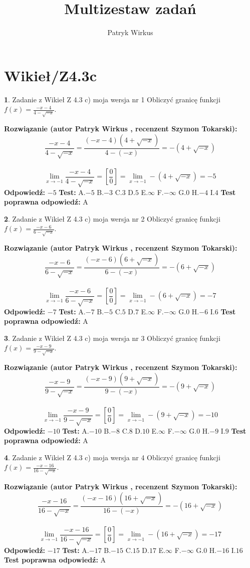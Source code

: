 \documentclass[12pt, a4paper]{article}
\title{Multizestaw zadań}
\author{Patryk Wirkus}
\date{}
\theoremstyle{definition} %
\newtheorem{zad}{}
\newcommand{\kategoria}[1]{\section{#1}}
\newcommand{\zadStart}[1]{\begin{zad}#1\newline}
\newcommand{\zadStop}{\end{zad}}
\newcommand{\rozwStart}[2]{\noindent \textbf{Rozwiązanie (autor #1 , recenzent #2): }\newline}
\newcommand{\rozwStop}{\newline}
\newcommand{\odpStart}{\noindent \textbf{Odpowiedź:}\newline}
\newcommand{\odpStop}{\newline}
\newcommand{\testStart}{\noindent \textbf{Test:}\newline}
\newcommand{\testStop}{\newline}
\newcommand{\kluczStart}{\noindent \textbf{Test poprawna odpowiedź:}\newline}
\newcommand{\kluczStop}{\newline}
\begin{document}
\maketitle

\kategoria{Wikieł/Z4.3c}


\zadStart{Zadanie z Wikieł Z 4.3 c) moja wersja nr 1}
Obliczyć granicę funkcji $f(x)=\frac{-x-4}{4-\sqrt{-x}}$.
\zadStop
\rozwStart{Patryk Wirkus}{Szymon Tokarski}
$$\frac{-x-4}{4-\sqrt{-x}}=\frac{(-x-4)(4+\sqrt{-x})}{4-(-x)}=-(4+\sqrt{-x})$$
\\
$$\lim\limits_{x\to-1}\frac{-x-4}{4-\sqrt{-x}}=[\frac{0}{0}]=\lim\limits_{x\to-1}-(4+\sqrt{-x}) =-5$$
\rozwStop
\odpStart
$-5$
\odpStop
\testStart
A.$-5$
B.$-3$
C.$3$
D.$5$
E.$\infty$
F.$-\infty$
G.$0$
H.$-4$
I.$4$
\testStop
\kluczStart
A
\kluczStop



\zadStart{Zadanie z Wikieł Z 4.3 c) moja wersja nr 2}
Obliczyć granicę funkcji $f(x)=\frac{-x-6}{6-\sqrt{-x}}$.
\zadStop
\rozwStart{Patryk Wirkus}{Szymon Tokarski}
$$\frac{-x-6}{6-\sqrt{-x}}=\frac{(-x-6)(6+\sqrt{-x})}{6-(-x)}=-(6+\sqrt{-x})$$
\\
$$\lim\limits_{x\to-1}\frac{-x-6}{6-\sqrt{-x}}=[\frac{0}{0}]=\lim\limits_{x\to-1}-(6+\sqrt{-x}) =-7$$
\rozwStop
\odpStart
$-7$
\odpStop
\testStart
A.$-7$
B.$-5$
C.$5$
D.$7$
E.$\infty$
F.$-\infty$
G.$0$
H.$-6$
I.$6$
\testStop
\kluczStart
A
\kluczStop



\zadStart{Zadanie z Wikieł Z 4.3 c) moja wersja nr 3}
Obliczyć granicę funkcji $f(x)=\frac{-x-9}{9-\sqrt{-x}}$.
\zadStop
\rozwStart{Patryk Wirkus}{Szymon Tokarski}
$$\frac{-x-9}{9-\sqrt{-x}}=\frac{(-x-9)(9+\sqrt{-x})}{9-(-x)}=-(9+\sqrt{-x})$$
\\
$$\lim\limits_{x\to-1}\frac{-x-9}{9-\sqrt{-x}}=[\frac{0}{0}]=\lim\limits_{x\to-1}-(9+\sqrt{-x}) =-10$$
\rozwStop
\odpStart
$-10$
\odpStop
\testStart
A.$-10$
B.$-8$
C.$8$
D.$10$
E.$\infty$
F.$-\infty$
G.$0$
H.$-9$
I.$9$
\testStop
\kluczStart
A
\kluczStop



\zadStart{Zadanie z Wikieł Z 4.3 c) moja wersja nr 4}
Obliczyć granicę funkcji $f(x)=\frac{-x-16}{16-\sqrt{-x}}$.
\zadStop
\rozwStart{Patryk Wirkus}{Szymon Tokarski}
$$\frac{-x-16}{16-\sqrt{-x}}=\frac{(-x-16)(16+\sqrt{-x})}{16-(-x)}=-(16+\sqrt{-x})$$
\\
$$\lim\limits_{x\to-1}\frac{-x-16}{16-\sqrt{-x}}=[\frac{0}{0}]=\lim\limits_{x\to-1}-(16+\sqrt{-x}) =-17$$
\rozwStop
\odpStart
$-17$
\odpStop
\testStart
A.$-17$
B.$-15$
C.$15$
D.$17$
E.$\infty$
F.$-\infty$
G.$0$
H.$-16$
I.$16$
\testStop
\kluczStart
A
\kluczStop
\end{document}
